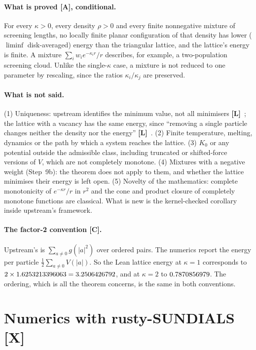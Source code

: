 \documentclass[11pt]{article}
\theoremstyle{remark}
\newcommand{\tier}[1]{\textbf{[#1]}}
\begin{document}
\paragraph{What is proved \tier{A}, conditional.} For every $\kappa>0$, every density $\rho>0$ and every finite
nonnegative mixture of screening lengths, no locally finite planar configuration of that density has lower
($\liminf$ disk-averaged) energy than the triangular lattice, and the lattice's energy is finite. A mixture
$\sum_iw_ie^{-\kappa_ir}/r$ describes, for example, a two-population screening cloud. Unlike the single-$\kappa$ case,
a mixture is not reduced to one parameter by rescaling, since the ratios $\kappa_i/\kappa_j$ are preserved.

\paragraph{What is not said.} (1) Uniqueness: upstream identifies the minimum value, not all minimisers \tier{L}~\cite{oai};
the lattice with a vacancy has the same energy, since ``removing a single particle changes neither the density nor
the energy'' \tier{L}~\cite[arXiv version, p.~8, remark after Thm.~1.4]{ckmrv}. (2) Finite temperature, melting, dynamics or the path by which a
system reaches the lattice. (3) $K_0$ or any potential outside the admissible class, including truncated or
shifted-force versions of $V$, which are not completely monotone. (4) Mixtures with a negative weight (Step~9b): the theorem does not apply to them, and whether the lattice minimises
their energy is left open.
(5) Novelty of the mathematics: complete monotonicity of $e^{-\kappa r}/r$ in $r^2$ and the cone and product closure
of completely monotone functions are classical. What is new is the kernel-checked corollary inside upstream's
framework.

\paragraph{The factor-2 convention \tier{C}.} Upstream's  is $\sum_{a\ne0}g(|a|^2)$ over ordered
pairs. The numerics report the energy per particle $\tfrac12\sum_{a\ne0}V(|a|)$. So the Lean lattice energy at
$\kappa=1$ corresponds to $2\times1.6253213396063=3.2506426792$, and at $\kappa=2$ to $0.7870856979$. The ordering, which is
all the theorem concerns, is the same in both conventions.

\section{Numerics with rusty-SUNDIALS \tier{X}}\label{sec:numerics}
\end{document}
